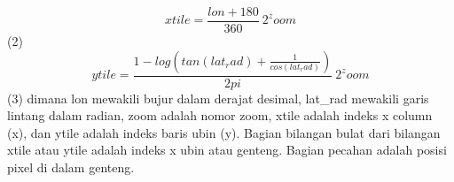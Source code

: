 \begin{equation}
	    xtile = \frac{lon + 180}{360} \ 2^zoom 
\end{equation}
(2)
\begin{equation}
	    ytile =\frac{1-log (tan(lat_rad) + \frac{1}{cos(lat_rad)})}{2pi} \ 2^zoom 
\end{equation}
(3)
dimana lon mewakili bujur dalam derajat desimal, lat_rad mewakili garis lintang dalam radian, zoom adalah nomor zoom, xtile adalah 
indeks x column (x), dan ytile adalah indeks baris ubin (y). Bagian bilangan bulat dari bilangan xtile atau ytile adalah indeks x ubin 
atau genteng. Bagian pecahan adalah posisi pixel di dalam genteng.


